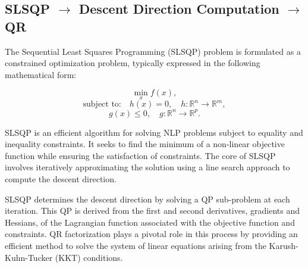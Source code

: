 \subsection{SLSQP $\rightarrow$ Descent Direction Computation $\rightarrow$ QR}
The Sequential Least Squares Programming (SLSQP) problem is formulated as a constrained optimization problem, typically expressed in the following mathematical form:

\begin{equation}
    \min_{x} f(x),
\end{equation}
\begin{equation}
    \text{subject to:} \quad h(x) = 0, \quad h: \mathbb{R}^n \to \mathbb{R}^m,
\end{equation}
\begin{equation}
    g(x) \leq 0, \quad g: \mathbb{R}^n \to \mathbb{R}^p.
\end{equation}

SLSQP is an efficient algorithm for solving NLP problems subject to equality and inequality constraints. It seeks to find the minimum of a non-linear objective function while ensuring the satisfaction of constraints. The core of SLSQP involves iteratively approximating the solution using a line search approach to compute the descent direction.

SLSQP determines the descent direction by solving a QP sub-problem at each iteration. This QP is derived from the first and second derivatives, gradients and Hessians, of the Lagrangian function associated with the objective function and constraints. QR factorization plays a pivotal role in this process by providing an efficient method to solve the system of linear equations arising from the Karush-Kuhn-Tucker (KKT) conditions\cite{cfc5dc07425343f08f3c8ee5ae8f7ddc}.

